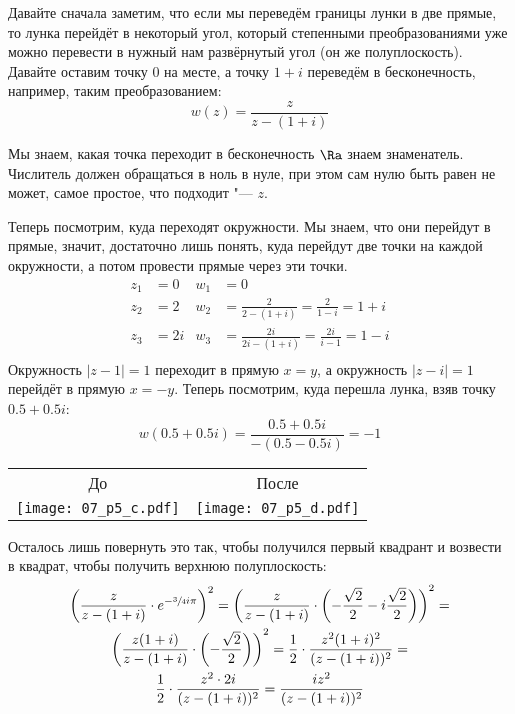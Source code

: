 	Давайте сначала заметим, что если мы переведём границы лунки в две прямые, то лунка перейдёт в некоторый угол,
	который степенными преобразованиями уже можно перевести в нужный нам развёрнутый угол (он же полуплоскость).
	Давайте оставим точку 0 на месте, а точку $1+i$ переведём в бесконечность, например, таким преобразованием:
	\[ w(z) = \frac{z}{z-(1+i)} \]
	\begin{Rem}
		Мы знаем, какая точка переходит в бесконечность $\Ra$ знаем знаменатель.
		Числитель должен обращаться в ноль в нуле, при этом сам нулю быть равен не может,
		самое простое, что подходит "--- $z$.
	\end{Rem}
	Теперь посмотрим, куда переходят окружности.
	Мы знаем, что они перейдут в прямые, значит, достаточно лишь понять, куда перейдут две точки на каждой окружности,
	а потом провести прямые через эти точки.
	\begin{align*}
		z_1 &= 0 & w_1 &= 0 \\
		z_2 &= 2 & w_2 &= \frac{2}{2-(1+i)} = \frac{2}{1-i} = 1 + i \\
		z_3 &= 2i & w_3 &= \frac{2i}{2i-(1+i)} = \frac{2i}{i-1} = 1-i \\
	\end{align*}
	Окружность $|z-1|=1$ переходит в прямую $x=y$, а окружность $|z-i|=1$ перейдёт в прямую $x=-y$.
	Теперь посмотрим, куда перешла лунка, взяв точку $0.5+0.5i$:
	\[ w(0.5+0.5i) = \frac{0.5+0.5i}{-(0.5-0.5i)} = -1 \]
	\begin{center}
		\begin{tabular}{cc}
		До & После \\
		\texttt{[image: 07\_p5\_c.pdf]} & \texttt{[image: 07\_p5\_d.pdf]} \\
		\end{tabular}
	\end{center}
	Осталось лишь повернуть это так, чтобы получился первый квадрант и возвести в квадрат, чтобы получить верхнюю полуплоскость:
	\begin{gather*}
		\left(\frac{z}{z-(1+i)} \cdot e^{-\sfrac 3 4 i \pi}\right)^2 =
		\left(\frac{z}{z-(1+i)} \cdot \left(-\frac{\sqrt 2}{2} -i\frac{\sqrt 2}{2}\right)\right)^2 = \\
		\left(\frac{z(1+i)}{z-(1+i)} \cdot \left(-\frac{\sqrt 2}{2}\right)\right)^2 =
		\frac12 \cdot \frac{z^2(1+i)^2}{(z-(1+i))^2} = \\
		\frac12 \cdot \frac{z^2\cdot2i}{(z-(1+i))^2} =
		\frac{iz^2}{(z-(1+i))^2}
	\end{gather*}
